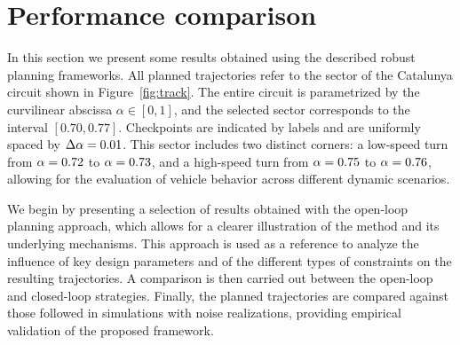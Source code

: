 \section{Performance comparison}
\label{sec:performance_comparison}

In this section we present some results obtained using the described robust planning frameworks. All planned trajectories refer to the sector of the Catalunya circuit shown in Figure~\ref{fig:track}.
The entire circuit is parametrized by the curvilinear abscissa $\alpha \in [0,1]$, and the selected sector corresponds to the interval $\left[0.70, 0.77\right]$. Checkpoints are indicated by labels and are uniformly spaced by $\Delta\alpha=0.01$. This sector includes two distinct corners: a low-speed turn from $\alpha = 0.72$ to $\alpha = 0.73$, and a high-speed turn from $\alpha = 0.75$ to $\alpha = 0.76$, allowing for the evaluation of vehicle behavior across different dynamic scenarios.

We begin by presenting a selection of results obtained with the open-loop planning approach, which allows for a clearer illustration of the method and its underlying mechanisms. This approach is used as a reference to analyze the influence of key design parameters and of the different types of constraints on the resulting trajectories. A comparison is then carried out between the open-loop and closed-loop strategies. Finally, the planned trajectories are compared against those followed in simulations with noise realizations, providing empirical validation of the proposed framework.


